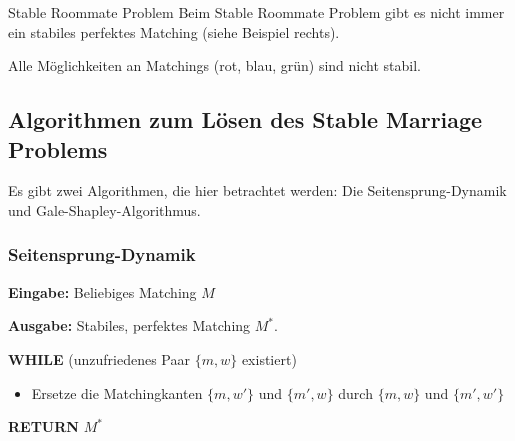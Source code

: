 \documentclass{panikzettel}
\begin{document}
{\begin{halfboxl}
\begin{defi}{Stable Roommate Problem}
		Beim Stable Roommate Problem gibt es nicht immer ein stabiles perfektes Matching (siehe Beispiel rechts).
	\end{defi}
\end{halfboxl}%
\begin{halfboxr}
	\vspace{-\baselineskip}	
	\begin{center}
		
		Alle Möglichkeiten an Matchings (rot, blau, grün) sind nicht stabil.
	\end{center}
\end{halfboxr}

\subsection{Algorithmen zum Lösen des Stable Marriage Problems}

Es gibt zwei Algorithmen, die hier betrachtet werden: Die Seitensprung-Dynamik und Gale-Shapley-Algorithmus.

\subsubsection{Seitensprung-Dynamik}
\begin{algo}
	\textbf{Eingabe:} Beliebiges Matching $M$
	
	\textbf{Ausgabe:} Stabiles, perfektes Matching $M^*$.
	\tcblower
	
	\textbf{WHILE} (unzufriedenes Paar $\{m,w\}$ existiert)
	\begin{itemize}
		\item Ersetze die Matchingkanten $\{m,w'\}$ und $\{m',w\}$ durch $\{m,w\}$ und $\{m',w'\}$
	\end{itemize}
	\textbf{RETURN} $M^*$
	

\end{algo}}
\end{document}
